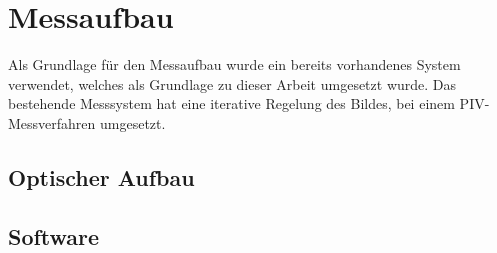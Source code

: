 \chapter{Messaufbau}
Als Grundlage für den Messaufbau wurde ein bereits vorhandenes System verwendet, welches als Grundlage zu dieser Arbeit umgesetzt wurde. Das bestehende Messsystem hat eine iterative Regelung des Bildes, bei einem PIV-Messverfahren umgesetzt. 

\section{Optischer Aufbau}

\section{Software}